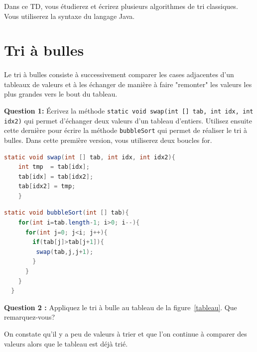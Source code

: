 \documentclass[iutinfo,a4paper,nocorrections,10pt]{ustl-tdtp}
\date{\annee{2018}--\annee{2019}}
\begin{document}
\maketitle
\thispagestyle{empty}

Dans ce TD, vous étudierez et écrirez plusieurs algorithmes de tri classiques. Vous utiliserez la syntaxe du langage Java.


\section{Tri à bulles}

\paragraph{} Le tri à bulles consiste à successivement comparer les cases adjacentes d'un tableaux de valeurs et à les échanger de manière à faire "remonter" les valeurs les plus grandes vers le bout du tableau.
\newline

\textbf{Question 1:} Écrivez la méthode \texttt{static void swap(int [] tab, int idx, int idx2)} qui permet d'échanger deux valeurs d'un tableau d'entiers. Utilisez ensuite cette dernière pour écrire la méthode \texttt{bubbleSort} qui permet de réaliser le tri à bulles. Dans cette première version, vous utiliserez deux boucles for.
\newline
\begin{correction}
{\color{red}
\begin{lstlisting}[language=java]
  static void swap(int [] tab, int idx, int idx2){
	int tmp  = tab[idx];
	tab[idx] = tab[idx2];
	tab[idx2] = tmp;	
    }


\end{lstlisting}

\begin{lstlisting}[language=java]
  static void bubbleSort(int [] tab){	
	for(int i=tab.length-1; i>0; i--){
	  for(int j=0; j<i; j++){
	    if(tab[j]>tab[j+1]){
	     swap(tab,j,j+1);
	    }
	  }
	}
  }
\end{lstlisting}
}
\end{correction}


\textbf{Question 2 :} Appliquez le tri à bulle au tableau de la figure~\ref{tableau}. Que remarquez-vous?
\newline
\begin{correction}
{\color{red}
On constate qu'il y a peu de valeurs à trier et que l'on continue à comparer des valeurs alors que le tableau est déjà trié.
}
\end{correction}
\end{document}
